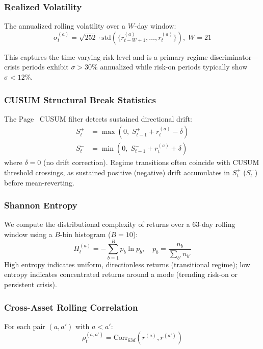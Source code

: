 \documentclass[conference, twocolumn]{IEEEtran}
\begin{document}
\subsubsection{Realized Volatility}
The annualized rolling volatility over a $W$-day window:
\begin{equation}
    \sigma_t^{(a)} = \sqrt{252} \cdot \text{std}\!\left(\{r_{t-W+1}^{(a)}, \ldots, r_t^{(a)}\}\right), \; W\!=\!21
\label{eq:vol}
\end{equation}

This captures the time-varying risk level and is a primary regime discriminator---crisis periods exhibit $\sigma > 30\%$ annualized while risk-on periods typically show $\sigma < 12\%$.

\subsubsection{CUSUM Structural Break Statistics}
The Page~\cite{page1954} CUSUM filter detects sustained directional drift:
\begin{align}
    S_t^{+} &= \max\!\left(0,\; S_{t-1}^{+} + r_t^{(a)} - \delta\right) \label{eq:cusum_pos}\\
    S_t^{-} &= \min\!\left(0,\; S_{t-1}^{-} + r_t^{(a)} + \delta\right) \label{eq:cusum_neg}
\end{align}
where $\delta = 0$ (no drift correction). Regime transitions often coincide with CUSUM threshold crossings, as sustained positive (negative) drift accumulates in $S_t^{+}$ ($S_t^{-}$) before mean-reverting.

\subsubsection{Shannon Entropy}
We compute the distributional complexity of returns over a 63-day rolling window using a $B$-bin histogram ($B=10$):
\begin{equation}
    H_t^{(a)} = -\sum_{b=1}^{B} p_b \ln p_b, \quad p_b = \frac{n_b}{\sum_{b'} n_{b'}}
\label{eq:entropy}
\end{equation}
High entropy indicates uniform, directionless returns (transitional regime); low entropy indicates concentrated returns around a mode (trending risk-on or persistent crisis).

\subsubsection{Cross-Asset Rolling Correlation}
For each pair $(a, a')$ with $a < a'$:
\begin{equation}
    \rho_t^{(a,a')} = \text{Corr}_{63d}\!\left(r^{(a)}, r^{(a')}\right)
\label{eq:corr}
\end{equation}
\end{document}
